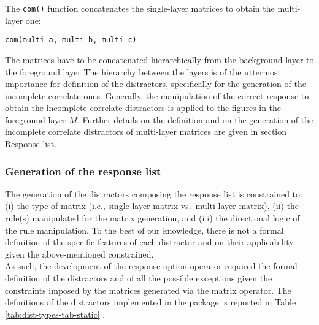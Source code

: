 %
%

The \texttt{com()} function concatenates the single-layer matrices to obtain the multi-layer one:

\begin{verbatim}
com(multi_a, multi_b, multi_c)
\end{verbatim}

The matrices have to be concatenated hierarchically from the background layer to the foreground layer The hierarchy between the layers is of the uttermost importance for definition of the distractors, specifically for the generation of the incomplete correlate ones.
Generally, the manipulation of the correct response to obtain the incomplete correlate distractors is applied to the figures in the foreground layer \(M\).
Further details on the definition and on the generation of the incomplete correlate distractors of multi-layer matrices are given in section Response list.

\subsubsection{Generation of the response list}\label{generation-of-the-response-list}

The generation of the distractors composing the response list is constrained to: (i) the type of matrix (i.e., single-layer matrix vs.~multi-layer matrix), (ii) the rule(s) manipulated for the matrix generation, and (iii) the directional logic of the rule manipulation.
To the best of our knowledge, there is not a formal definition of the specific features of each distractor and on their applicability given the above-mentioned constrained.\\
As such, the development of the response option operator required the formal definition of the distractors and of all the possible exceptions given the constraints imposed by the matrices generated via the matrix operator.
The definitions of the distractors implemented in the  package is reported in Table \ref{tab:dist-types-tab-static} .

